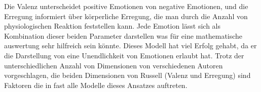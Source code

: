 Die Valenz unterscheidet positive Emotionen von negative Emotionen, und die Erregung informiert über körperliche Erregung, die man durch die Anzahl von physiologischen Reaktion feststellen kann. 
Jede Emotion lässt sich als Kombination dieser beiden Parameter darstellen was für eine mathematische auswertung sehr hilfreich sein könnte. 
Dieses Modell hat viel Erfolg gehabt, da er die Darstellung von eine Unendlichkeit von Emotionen erlaubt hat. 
Trotz der unterschiedlichen Anzahl von Dimensionen von verschiedenen Autoren vorgeschlagen, die beiden Dimensionen von Russell (Valenz und Erregung) sind Faktoren die in fast alle Modelle dieses Ansatzes auftreten.



